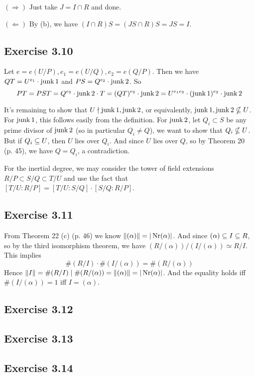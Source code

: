 \documentclass[../Marcus.tex]{subfiles}
\begin{document}
$(\Rightarrow)$ Just take $J=I\cap R$ and done.

$(\Leftarrow)$ By (b), we have $(I\cap R)S = (JS\cap R)S = JS = I$.

\subsection*{Exercise 3.10}

Let $e=e(U/P),e_1=e(U/Q),e_2=e(Q/P)$. Then we have $QT=U^{e_1}\cdot\operatorname{junk}1$ and $PS=Q^{e_2}\cdot\operatorname{junk}2$. So $$PT = PST = Q^{e_2}\cdot\operatorname{junk}2\cdot T = (QT)^{e_2}\cdot\operatorname{junk}2 = U^{e_1e_2}\cdot(\operatorname{junk}1)^{e_2}\cdot\operatorname{junk}2$$

It's remaining to show that $U \nmid \operatorname{junk}1 , \operatorname{junk}2$, or equivalently, $\operatorname{junk}1,\operatorname{junk}2 \nsubseteq U$. For $\operatorname{junk}1$, this follows easily from the definition. For $\operatorname{junk}2$, let $Q_i\subset S$ be any prime divisor of $\operatorname{junk}2$ (so in particular $Q_i \neq Q$), we want to show that $Q_i \nsubseteq U$. But if $Q_i \subseteq U$, then $U$ lies over $Q_i$. And since $U$ lies over $Q$, so by Theorem 20 (p. 45), we have $Q=Q_i$, a contradiction.

For the inertial degree, we may consider the tower of field extensions $R/P\subset S/Q\subset T/U$ and use the fact that $[T/U:R/P]=[T/U:S/Q]\cdot[S/Q:R/P]$.

\subsection*{Exercise 3.11}

From Theorem 22 (c) (p. 46) we know $\|(\alpha)\|=|\operatorname{Nr}(\alpha)|$. And since $(\alpha)\subseteq I \subseteq R$, so by the third isomorphism theorem, we have $(R/(\alpha))/(I/(\alpha))\simeq R/I$. This implies $$\#(R/I)\cdot\#(I/(\alpha))=\#(R/(\alpha))$$ Hence $\|I\|=\#(R/I)\mid \#(R/(\alpha))=\|(\alpha)\|=|\operatorname{Nr}(\alpha)|$. And the equality holds iff $\#(I/(\alpha))=1$ iff $I=(\alpha)$.

\subsection*{Exercise 3.12}

\subsection*{Exercise 3.13}

\subsection*{Exercise 3.14}
\end{document}
